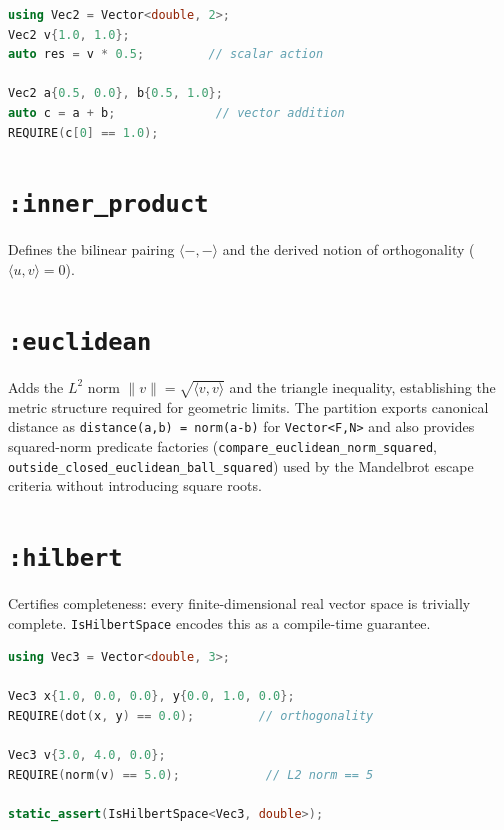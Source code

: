 \documentclass[11pt, a4paper]{report}
\begin{document}
\begin{lstlisting}[language=C++, caption={Geometry: affine vector operations (from \texttt{affine\_test.cpp}).}, label={lst:geometry-affine}]
using Vec2 = Vector<double, 2>;
Vec2 v{1.0, 1.0};
auto res = v * 0.5;         // scalar action

Vec2 a{0.5, 0.0}, b{0.5, 1.0};
auto c = a + b;              // vector addition
REQUIRE(c[0] == 1.0);
\end{lstlisting}

\section{\texttt{:inner\_product}}
\label{sec:geometry-inner-product}

Defines the bilinear pairing $\langle -, - \rangle$ and the derived notion of orthogonality ($\langle u, v \rangle = 0$).

\section{\texttt{:euclidean}}
\label{sec:geometry-euclidean}

Adds the $L^2$ norm $\|v\| = \sqrt{\langle v, v \rangle}$ and the triangle inequality, establishing the metric structure required for geometric limits.
The partition exports canonical distance as \texttt{distance(a,b) = norm(a-b)} for \texttt{Vector<F,N>} and also provides squared-norm predicate factories (\texttt{compare\_euclidean\_norm\_squared}, \texttt{outside\_closed\_euclidean\_ball\_squared}) used by the Mandelbrot escape criteria without introducing square roots.

\section{\texttt{:hilbert}}
\label{sec:geometry-hilbert}

Certifies completeness: every finite-dimensional real vector space is trivially complete. \texttt{IsHilbertSpace} encodes this as a compile-time guarantee.

\begin{lstlisting}[language=C++, caption={Geometry: Hilbert space verification (from \texttt{hilbert\_test.cpp}).}, label={lst:geometry-hilbert}]
using Vec3 = Vector<double, 3>;

Vec3 x{1.0, 0.0, 0.0}, y{0.0, 1.0, 0.0};
REQUIRE(dot(x, y) == 0.0);         // orthogonality

Vec3 v{3.0, 4.0, 0.0};
REQUIRE(norm(v) == 5.0);            // L2 norm == 5

static_assert(IsHilbertSpace<Vec3, double>);
\end{lstlisting}
\end{document}
